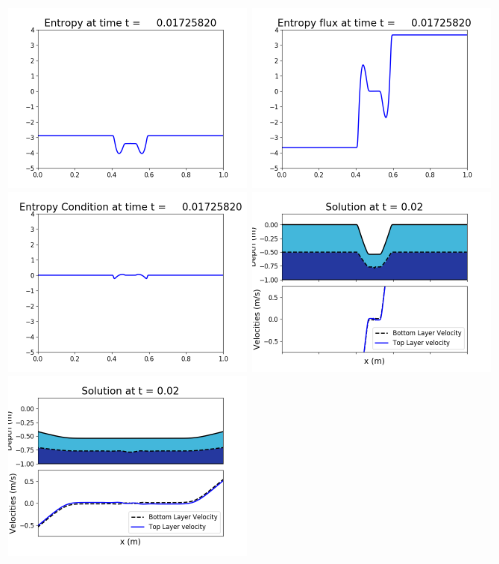 \documentclass[11pt]{article}
\begin{document}
\vskip 10pt 
\includegraphics[width=0.475\textwidth]{frame0050fig1007.png}
\includegraphics[width=0.475\textwidth]{frame0050fig1008.png}
\vskip 10pt 
\includegraphics[width=0.475\textwidth]{frame0050fig1009.png}
\vskip 10pt 
\includegraphics[width=0.475\textwidth]{frame0051fig1001.png}
\includegraphics[width=0.475\textwidth]{frame0051fig1002.png}
\end{document}
